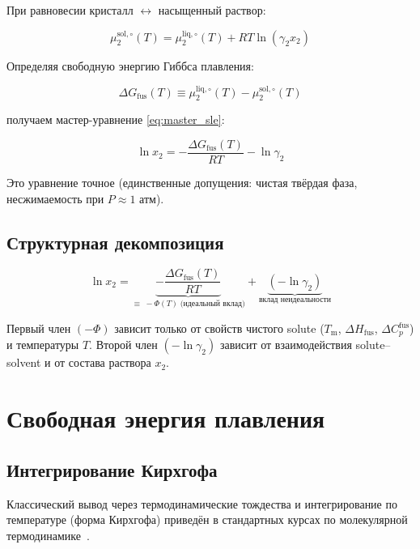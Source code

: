 \documentclass[11pt]{article}
\begin{document}
При равновесии кристалл $\leftrightarrow$ насыщенный раствор:

\begin{equation*}
\mu_2^{\mathrm{sol},\circ}(T) = \mu_2^{\mathrm{liq},\circ}(T) + RT \ln(\gamma_2 x_2)
\end{equation*}

Определяя свободную энергию Гиббса плавления:

\begin{equation*}
\Delta G_{\mathrm{fus}}(T) \equiv \mu_2^{\mathrm{liq},\circ}(T) - \mu_2^{\mathrm{sol},\circ}(T)
\end{equation*}

получаем мастер-уравнение \eqref{eq:master_sle}:

\begin{equation}
\boxed{\ln x_2 = -\frac{\Delta G_{\mathrm{fus}}(T)}{RT} - \ln \gamma_2}
\label{eq:master_sle}
\end{equation}

Это уравнение точное (единственные допущения: чистая твёрдая фаза, несжимаемость при $P \approx 1$ атм).

\subsection{Структурная декомпозиция}

\begin{equation*}
\ln x_2 = \underbrace{-\frac{\Delta G_{\mathrm{fus}}(T)}{RT}}_{\equiv\; -\Phi(T)\;\text{(идеальный вклад)}} + \underbrace{(-\ln \gamma_2)}_{\text{вклад неидеальности}}
\end{equation*}

Первый член $(-\Phi)$ зависит только от свойств чистого solute ($T_{\mathrm{m}}$, $\Delta H_{\mathrm{fus}}$, $\Delta C_p^{\mathrm{fus}}$) и температуры $T$. Второй член $(-\ln \gamma_2)$ зависит от взаимодействия solute--solvent и от состава раствора $x_2$.

\section{Свободная энергия плавления}

\subsection{Интегрирование Кирхгофа}
Классический вывод через термодинамические тождества и интегрирование по температуре (форма Кирхгофа) приведён в стандартных курсах по молекулярной термодинамике~\cite{prausnitz1998}.
\end{document}
